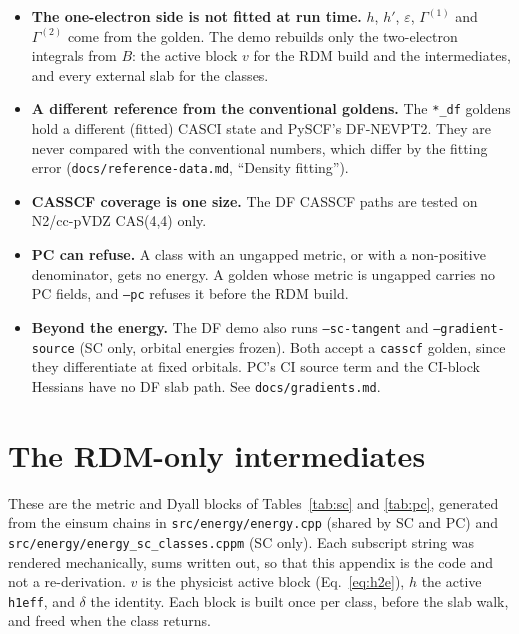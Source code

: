 \documentclass[11pt]{article}
\newcommand{\code}[1]{\texttt{#1}}
\newcommand{\G}[1]{\Gamma^{(#1)}}
\newcommand{\eps}{\varepsilon}
\begin{document}
\begin{itemize}
\item \textbf{The one-electron side is not fitted at run time.} $h$, $h'$,
  $\eps$, $\G1$ and $\G2$ come from the golden. The demo rebuilds only the
  two-electron integrals from $B$: the active block $v$ for the RDM build and
  the intermediates, and every external slab for the classes.
\item \textbf{A different reference from the conventional goldens.} The
  \code{*\_df} goldens hold a different (fitted) CASCI state and PySCF's
  DF-NEVPT2. They are never compared with the conventional numbers, which
  differ by the fitting error (\code{docs/reference-data.md}, ``Density
  fitting'').
\item \textbf{CASSCF coverage is one size.} The DF CASSCF paths are tested on
  N2/cc-pVDZ CAS(4,4) only.
\item \textbf{PC can refuse.} A class with an ungapped metric, or with a
  non-positive denominator, gets no energy. A golden whose metric is
  ungapped carries no PC fields, and \code{--pc} refuses it before the RDM
  build.
\item \textbf{Beyond the energy.} The DF demo also runs \code{--sc-tangent}
  and \code{--gradient-source} (SC only, orbital energies frozen). Both accept a
  \code{casscf} golden, since they differentiate at fixed orbitals. PC's CI
  source term and the CI-block Hessians have no DF slab path. See
  \code{docs/gradients.md}.
\end{itemize}

\appendix
\section{The RDM-only intermediates}
\label{app:intermediates}

These are the metric and Dyall blocks of Tables~\ref{tab:sc} and
\ref{tab:pc}, generated from the einsum chains in \code{src/energy/energy.cpp}
(shared by SC and PC) and \code{src/energy/energy\_sc\_classes.cppm} (SC only).
Each subscript string was rendered mechanically, sums written out, so that
this appendix is the code and not a re-derivation. $v$ is the physicist
active block (Eq.~\eqref{eq:h2e}), $h$ the active \code{h1eff}, and $\delta$ the
identity. Each block is built once per class, before the slab walk, and freed
when the class returns.
\end{document}
